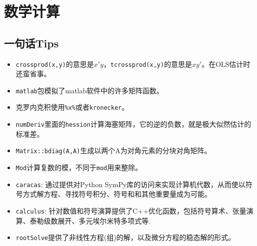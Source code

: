 \documentclass[
]{book}
\newenvironment{Shaded}{\begin{snugshade}}{\end{snugshade}}
\newcommand{\CommentTok}[1]{\textcolor[rgb]{0.56,0.35,0.01}{\textit{#1}}}
\newcommand{\ControlFlowTok}[1]{\textcolor[rgb]{0.13,0.29,0.53}{\textbf{#1}}}
\newcommand{\DataTypeTok}[1]{\textcolor[rgb]{0.13,0.29,0.53}{#1}}
\newcommand{\DecValTok}[1]{\textcolor[rgb]{0.00,0.00,0.81}{#1}}
\newcommand{\KeywordTok}[1]{\textcolor[rgb]{0.13,0.29,0.53}{\textbf{#1}}}
\newcommand{\NormalTok}[1]{#1}
\newcommand{\OperatorTok}[1]{\textcolor[rgb]{0.81,0.36,0.00}{\textbf{#1}}}
\newcommand{\StringTok}[1]{\textcolor[rgb]{0.31,0.60,0.02}{#1}}
\providecommand{\tightlist}{%
  \setlength{\itemsep}{0pt}\setlength{\parskip}{0pt}}
\begin{document}
\hypertarget{math}{%
\chapter{数学计算}\label{math}}

\hypertarget{ux4e00ux53e5ux8bddtips-5}{%
\section{一句话Tips}\label{ux4e00ux53e5ux8bddtips-5}}

\begin{itemize}
\tightlist
\item
  \texttt{crossprod(x,y)}的意思是\(x'y\)，\texttt{tcrossprod(x,y)}的意思是\(xy'\)。在OLS估计时还蛮省事。
\item
  \texttt{matlab}包模拟了matlab软件中的许多矩阵函数。
\item
  克罗内克积使用\texttt{\%x\%}或者\texttt{kronecker}。
\item
  \texttt{numDeriv}里面的\texttt{hession}计算海塞矩阵，它的逆的负数，就是极大似然估计的标准差。
\item
  \texttt{Matrix::bdiag(A,A)}生成以两个A为对角元素的分块对角矩阵。
\item
  \texttt{Mod}计算复数的模，不同于\texttt{mod}用来整除。
\item
  \texttt{caracas}: 通过提供对Python SymPy库的访问来实现计算机代数，从而使以符号方式解方程、寻找符号积分、符号和和其他重要量成为可能。
\item
  \texttt{calculus}: 针对数值和符号演算提供了C++优化函数，包括符号算术、张量演算、泰勒级数展开、多元埃尔米特多项式等.
\item
  \texttt{rootSolve}提供了非线性方程(组)的解，以及微分方程的稳态解的形式。
\end{itemize}

\begin{Shaded}
\end{Shaded}
\end{document}
